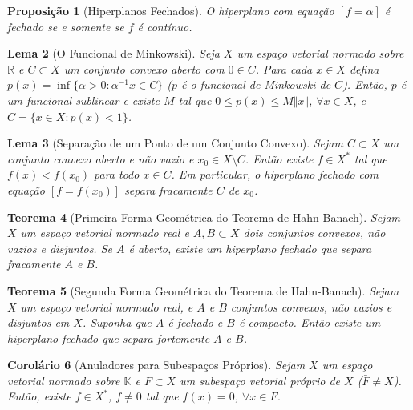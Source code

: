 \documentclass[12pt]{article}
\newtheorem{theorem}{Teorema}[section]
\newtheorem{proposition}[theorem]{Proposição}
\newtheorem{lemma}[theorem]{Lema}
\newtheorem{corollary}[theorem]{Corolário}
\begin{document}
\begin{multicols}{3}
\begin{proposition}[Hiperplanos Fechados]
O hiperplano com equação $[f = \alpha]$ é fechado se e somente se $f$ é contínuo.
\end{proposition}

\begin{lemma}[O Funcional de Minkowski]
Seja $X$ um espaço vetorial normado sobre $\mathbb{R}$ e $C \subset X$ um conjunto convexo aberto com $0 \in C$. Para cada $x \in X$ defina $p(x) = \inf\{\alpha > 0 : \alpha^{-1}x \in C\}$ ($p$ é o funcional de Minkowski de $C$). Então, $p$ é um funcional sublinear e existe $M$ tal que $0 \le p(x) \le M\Vert x \Vert$, $\forall x \in X$, e $C = \{x \in X: p(x) < 1\}$.
\end{lemma}

\begin{lemma}[Separação de um Ponto de um Conjunto Convexo]
Sejam $C \subset X$ um conjunto convexo aberto e não vazio e $x_0 \in X \setminus C$. Então existe $f \in X^*$ tal que $f(x) < f(x_0)$ para todo $x \in C$. Em particular, o hiperplano fechado com equação $[f = f(x_0)]$ separa fracamente $C$ de $x_0$.
\end{lemma}

\begin{theorem}[Primeira Forma Geométrica do Teorema de Hahn-Banach]
Sejam $X$ um espaço vetorial normado real e $A, B \subset X$ dois conjuntos convexos, não vazios e disjuntos. Se $A$ é aberto, existe um hiperplano fechado que separa fracamente $A$ e $B$.
\end{theorem}

\begin{theorem}[Segunda Forma Geométrica do Teorema de Hahn-Banach]
Sejam $X$ um espaço vetorial normado real, e $A$ e $B$ conjuntos convexos, não vazios e disjuntos em $X$. Suponha que $A$ é fechado e $B$ é compacto. Então existe um hiperplano fechado que separa fortemente $A$ e $B$.
\end{theorem}

\begin{corollary}[Anuladores para Subespaços Próprios]
Sejam $X$ um espaço vetorial normado sobre $\mathbb{K}$ e $F \subset X$ um subespaço vetorial próprio de $X$ ($\bar{F} \neq X$). Então, existe $f \in X^*$, $f \neq 0$ tal que $f(x) = 0$, $\forall x \in F$.
\end{corollary}
\end{multicols}
\end{document}

